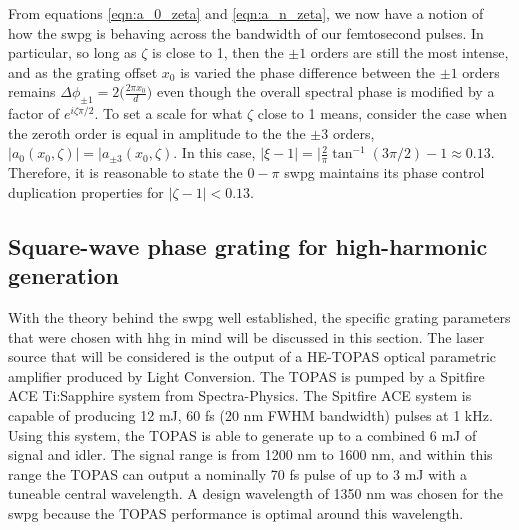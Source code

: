 From equations \ref{eqn:a_0_zeta} and \ref{eqn:a_n_zeta}, we now have a notion of how the \gls{swpg} is behaving across the bandwidth of our femtosecond pulses.  In particular, so long as $\zeta$ is close to 1, then the $\pm1$ orders are still the most intense, and as the grating offset $x_0$ is varied the phase difference between the $\pm1$ orders remains $\Delta\phi_{\pm1}=2\bigg(\frac{2\pi x_0}{d}\bigg)$ even though the overall spectral phase is modified by a factor of $e^{i\zeta\pi/2}$.  To set a scale for what $\zeta$ close to 1 means, consider the case when the zeroth order is equal in amplitude to the the $\pm3$ orders, $\rvert a_0(x_0,\zeta)\rvert = \rvert a_{\pm3}(x_0,\zeta)$.  In this case, $\rvert \xi - 1\rvert=\rvert\frac{2}{\pi}\tan^{-1}(3\pi/2)-1\approx0.13$.  Therefore, it is reasonable to state the $0-\pi$ \gls{swpg} maintains its phase control duplication properties for $\rvert\zeta - 1\rvert<0.13$.

\subsection{Square-wave phase grating for high-harmonic generation}
With the theory behind the \gls{swpg} well established, the specific grating parameters that were chosen with \gls{hhg} in mind will be discussed in this section.  The laser source that will be considered is the output of a HE-TOPAS optical parametric amplifier produced by Light Conversion.  The TOPAS is pumped by a Spitfire ACE Ti:Sapphire system from Spectra-Physics.  The Spitfire ACE system is capable of producing  12 mJ, 60 fs (20 nm FWHM bandwidth) pulses at 1 kHz.  Using this system, the TOPAS is able to generate up to a combined 6 mJ of signal and idler. The signal range is from 1200 nm to 1600 nm, and within this range the TOPAS can output a nominally 70 fs pulse of up to 3 mJ with a tuneable central wavelength.  A design wavelength of 1350 nm was chosen for the \gls{swpg} because the TOPAS performance is optimal around this wavelength.

